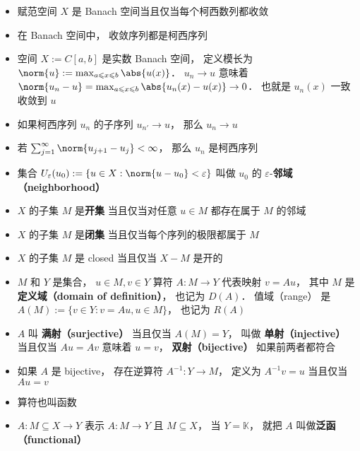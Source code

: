 \begin{itemize}
\item 赋范空间 $X$ 是 Banach 空间当且仅当每个柯西数列都收敛

\item 在 Banach 空间中， 收敛序列都是柯西序列

\item 空间 $X := C[a, b]$ 是实数 Banach 空间， 定义模长为 $\norm{u} := \max_{a \leqslant x \leqslant b} \abs{u(x)}$． $u_n \to u$ 意味着 $\norm{u_n - u} = \max_{a \leqslant x \leqslant b}  \abs{u_n(x) - u(x)} \to 0$． 也就是 $u_n(x)$ 一致收敛到 $u$

\item 如果柯西序列 $u_n$ 的子序列 $u_{n'} \to u$， 那么 $u_n \to u$

\item 若 $\sum_{j=1}^\infty \norm{u_{j+1} - u_j} < \infty$， 那么 $u_n$ 是柯西序列

\item 集合 $U_\varepsilon (u_0) := \{u \in X: \norm{u - u_0} < \varepsilon\}$ 叫做 $u_0$ 的 $\varepsilon$-\textbf{邻域 （neighborhood）}

\item $X$ 的子集 $M$ 是\textbf{开集} 当且仅当对任意 $u \in M$ 都存在属于 $M$ 的邻域

\item $X$ 的子集 $M$ 是\textbf{闭集} 当且仅当每个序列的极限都属于 $M$

\item $X$ 的子集 $M$ 是 closed 当且仅当 $X - M$ 是开的

\item $M$ 和 $Y$ 是集合， $u \in M, v \in Y$ 算符 $A: M \to Y$ 代表映射 $v = Au$， 其中 $M$ 是\textbf{定义域（domain of definition）}， 也记为 $D(A)$． 值域（range） 是 $A(M) := \{v \in Y: v = Au, u \in M\}$， 也记为 $R(A)$

\item $A$ 叫 \textbf{满射（surjective）} 当且仅当 $A(M) = Y$， 叫做 \textbf{单射（injective）} 当且仅当 $Au = Av$ 意味着 $u = v$， \textbf{双射（bijective）} 如果前两者都符合

\item 如果 $A$ 是 bijective， 存在逆算符 $A^{-1}: Y \to M$， 定义为 $A^{-1} v = u$ 当且仅当 $Au = v$

\item 算符也叫函数

\item $A: M \subseteq X \to Y$ 表示 $A: M \to Y$ 且 $M \subseteq X$， 当 $Y = \mathbb K$， 就把 $A$ 叫做\textbf{泛函（functional）}
\end{itemize}

